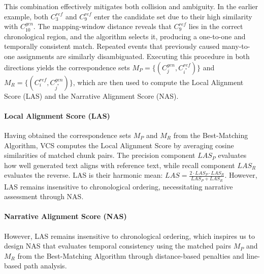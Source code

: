 \documentclass[letterpaper]{article} %
\begin{document}
This combination effectively mitigates both collision and ambiguity. In the earlier example, both $C_3^{ref}$ and $C_9^{ref}$ enter the candidate set due to their high similarity with $C_{10}^{gen}$. The mapping-window distance reveals that $C_9^{ref}$ lies in the correct chronological region, and the algorithm selects it, producing a one-to-one and temporally consistent match. Repeated events that previously caused many-to-one assignments are similarly disambiguated. Executing this procedure in both directions yields the correspondence sets $M_P = \{(C_j^{gen}, C_{i^*}^{ref})\}$ and $M_R = \{(C_i^{ref}, C_{j^*}^{gen})\}$, which are then used to compute the Local Alignment Score (LAS) and the Narrative Alignment Score (NAS).

\paragraph{Local Alignment Score (LAS)}
Having obtained the correspondence sets $M_P$ and $M_R$ from the Best-Matching Algorithm, VCS computes the Local Alignment Score by averaging cosine similarities of matched chunk pairs. The precision component $LAS_P$ evaluates how well generated text aligns with reference text, while recall component $LAS_R$ evaluates the reverse. LAS is their harmonic mean: $LAS = \frac{2 \cdot LAS_P \cdot LAS_R}{LAS_P + LAS_R}$. However, LAS remains insensitive to chronological ordering, necessitating narrative assessment through NAS.

\paragraph{Narrative Alignment Score (NAS)}
However, LAS remains insensitive to chronological ordering, which inspires us to design NAS that evaluates temporal consistency using the matched pairs $M_P$ and $M_R$ from the Best-Matching Algorithm through distance-based penalties and line-based path analysis.
\end{document}
